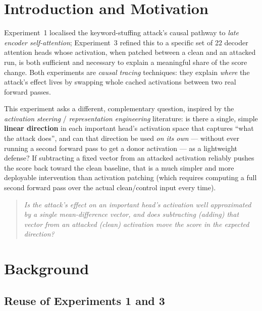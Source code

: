 \documentclass[11pt]{article}
\begin{document}
\section{Introduction and Motivation}

Experiment~1 localised the keyword-stuffing attack's causal pathway to
\emph{late encoder self-attention}; Experiment~3 refined this to a specific
set of 22 decoder attention heads whose activation, when patched between a
clean and an attacked run, is both sufficient and necessary to explain a
meaningful share of the score change. Both experiments are \emph{causal
tracing} techniques: they explain \emph{where} the attack's effect lives by
swapping whole cached activations between two real forward passes.

This experiment asks a different, complementary question, inspired by the
\emph{activation steering} / \emph{representation engineering} literature:
is there a single, simple \textbf{linear direction} in each important head's
activation space that captures ``what the attack does'', and can that
direction be used \emph{on its own} --- without ever running a second
forward pass to get a donor activation --- as a lightweight defense? If
subtracting a fixed vector from an attacked activation reliably pushes the
score back toward the clean baseline, that is a much simpler and more
deployable intervention than activation patching (which requires computing
a full second forward pass over the actual clean/control input every time).

\begin{quote}
\itshape Is the attack's effect on an important head's activation well
approximated by a single mean-difference vector, and does subtracting
(adding) that vector from an attacked (clean) activation move the score
in the expected direction?
\end{quote}

\section{Background}

\subsection{Reuse of Experiments 1 and 3}
\end{document}
